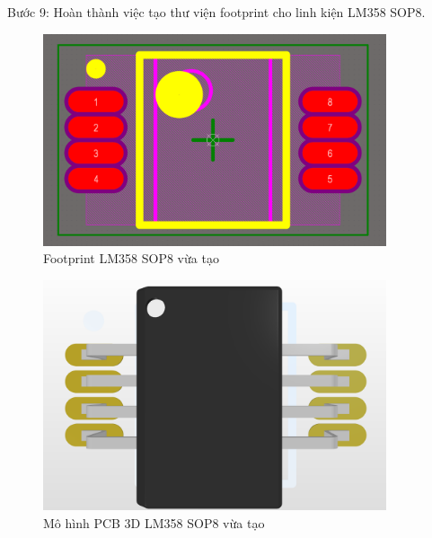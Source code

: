                 \cleardoublepage
                Bước 9: Hoàn thành việc tạo thư viện footprint cho linh kiện LM358 SOP8.
                \begin{figure}[H]
                    \centering
                    \includegraphics[width=0.9\textwidth]{pictures/ch3.11a.png}
                    \caption{Footprint LM358 SOP8 vừa tạo} 
                \end{figure}
                \begin{figure}[H]
                    \centering
                    \includegraphics[width=0.9\textwidth]{pictures/ch3.11b.png}
                    \caption{Mô hình PCB 3D LM358 SOP8 vừa tạo}
                \end{figure}
                \cleardoublepage
